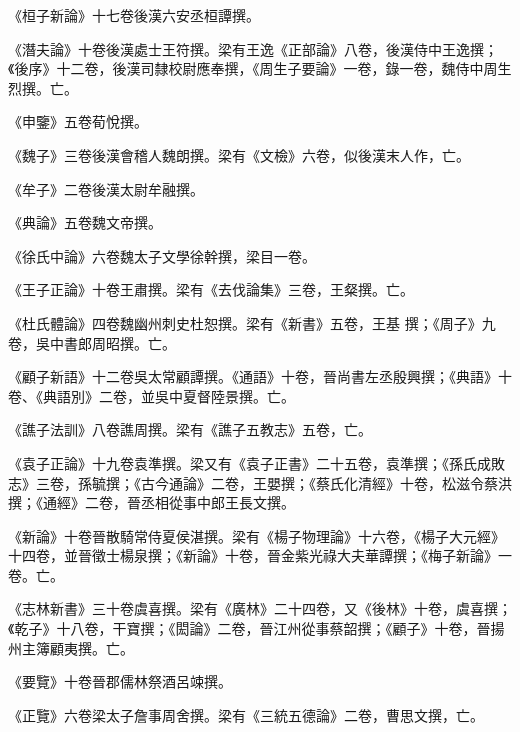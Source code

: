 \begin{pinyinscope}
 《桓子新論》十七卷後漢六安丞桓譚撰。



 《潛夫論》十卷後漢處士王符撰。梁有王逸《正部論》八卷，後漢侍中王逸撰；《後序》十二卷，後漢司隸校尉應奉撰，《周生子要論》一卷，錄一卷，魏侍中周生烈撰。亡。



 《申鑒》五卷荀悅撰。



 《魏子》三卷後漢會稽人魏朗撰。梁有《文檢》六卷，似後漢末人作，亡。



 《牟子》二卷後漢太尉牟融撰。



 《典論》五卷魏文帝撰。



 《徐氏中論》六卷魏太子文學徐幹撰，梁目一卷。



 《王子正論》十卷王肅撰。梁有《去伐論集》三卷，王粲撰。亡。



 《杜氏體論》四卷魏幽州刺史杜恕撰。梁有《新書》五卷，王基
 撰；《周子》九卷，吳中書郎周昭撰。亡。



 《顧子新語》十二卷吳太常顧譚撰。《通語》十卷，晉尚書左丞殷興撰；《典語》十卷、《典語別》二卷，並吳中夏督陸景撰。亡。



 《譙子法訓》八卷譙周撰。梁有《譙子五教志》五卷，亡。



 《袁子正論》十九卷袁準撰。梁又有《袁子正書》二十五卷，袁準撰；《孫氏成敗志》三卷，孫毓撰；《古今通論》二卷，王嬰撰；《蔡氏化清經》十卷，松滋令蔡洪撰；《通經》二卷，晉丞相從事中郎王長文撰。



 《新論》十卷晉散騎常侍夏侯湛撰。梁有《楊子物理論》十六卷，《楊子大元經》十四卷，並晉徵士楊泉撰；《新論》十卷，晉金紫光祿大夫華譚撰；《梅子新論》一卷。亡。



 《志林新書》三十卷虞喜撰。梁有《廣林》二十四卷，又《後林》十卷，虞喜撰；《乾子》十八卷，干寶撰；《閎論》二卷，晉江州從事蔡韶撰；《顧子》十卷，晉揚州主簿顧夷撰。亡。



 《要覽》十卷晉郡儒林祭酒呂竦撰。



 《正覽》六卷梁太子詹事周舍撰。梁有《三統五德論》二卷，曹思文撰，亡。




\end{pinyinscope}
